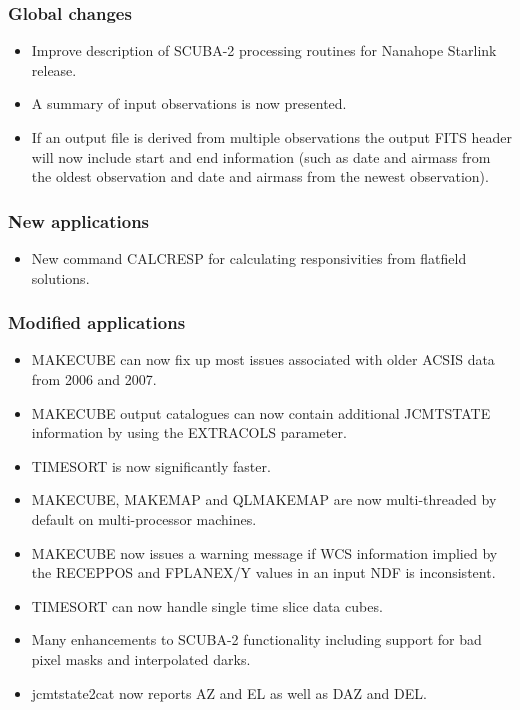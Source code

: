 \documentclass[twoside,11pt]{article}
\renewcommand{\_}{\texttt{\symbol{95}}}
\begin{document}
\subsubsection*{Global changes}
\begin{itemize}
\item Improve description of SCUBA-2 processing routines for Nanahope
  Starlink release.
\item A summary of input observations is now presented.
\item If an output file is derived from multiple observations the
  output FITS header will now include start and end information (such
  as date and airmass from the oldest observation and date and airmass
  from the newest observation).

\end{itemize}

\subsubsection*{New applications}
\begin{itemize}
  \item New command CALCRESP for calculating responsivities from
    flatfield solutions.
\end{itemize}

\subsubsection*{Modified applications}
\begin{itemize}
  \item MAKECUBE can now fix up most issues associated with older ACSIS data from 2006 and 2007.
  \item MAKECUBE output catalogues can now contain additional JCMTSTATE information by using the EXTRACOLS parameter.
  \item TIMESORT is now significantly faster.
  \item MAKECUBE, MAKEMAP and QLMAKEMAP are now multi-threaded by default on multi-processor machines.
  \item MAKECUBE now issues a warning message if WCS information implied by the RECEPPOS and FPLANEX/Y values in an input NDF is inconsistent.
  \item TIMESORT can now handle single time slice data cubes.
  \item Many enhancements to SCUBA-2 functionality including support for bad pixel masks and interpolated darks.
 \item jcmtstate2cat now reports AZ and EL as well as DAZ and DEL.
\end{itemize}
\end{document}
